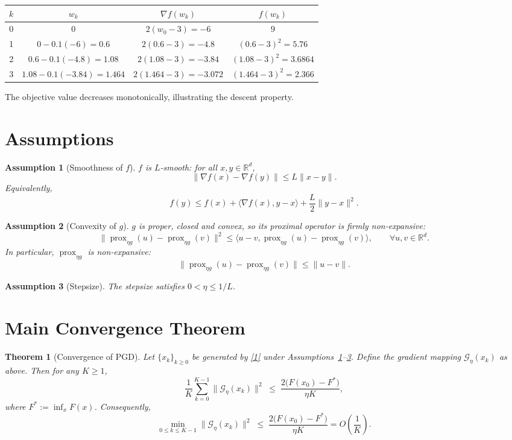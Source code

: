 \documentclass{article}
\newtheorem{theorem}{Theorem}
\newtheorem{assumption}{Assumption}
\newcommand{\prox}{\operatorname{prox}}
\newcommand{\grad}{\nabla}
\newcommand{\R}{\mathbb{R}}
\begin{document}
\begin{center}
\begin{tabular}{cccc}
\toprule
$k$ & $w_{k}$ & $\grad f(w_{k})$ & $f(w_{k})$\\
\midrule
0 & $0$                     & $2(w_{0}-3)=-6$      & $9$\\
1 & $0-0.1(-6)=0.6$         & $2(0.6-3)=-4.8$      & $(0.6-3)^{2}=5.76$\\
2 & $0.6-0.1(-4.8)=1.08$    & $2(1.08-3)=-3.84$    & $(1.08-3)^{2}=3.6864$\\
3 & $1.08-0.1(-3.84)=1.464$& $2(1.464-3)=-3.072$ & $(1.464-3)^{2}=2.366$\\
\bottomrule
\end{tabular}
\end{center}
The objective value decreases monotonically, illustrating the descent property.

\newpage
\section*{Assumptions}
\begin{assumption}[Smoothness of $f$]\label{as:lip}
$f$ is $L$‑smooth: for all $x,y\in\R^{d}$,
\[
\|\grad f(x)-\grad f(y)\|\le L\|x-y\|.
\]
Equivalently,
\[
f(y)\le f(x)+\langle\grad f(x),y-x\rangle+\frac{L}{2}\|y-x\|^{2}. \tag{2}
\]
\end{assumption}

\begin{assumption}[Convexity of $g$]\label{as:convex}
$g$ is proper, closed and convex, so its proximal operator is \emph{firmly non‑expansive}:
\[
\|\prox_{\eta g}(u)-\prox_{\eta g}(v)\|^{2}
\le \langle u-v,\prox_{\eta g}(u)-\prox_{\eta g}(v)\rangle,\qquad\forall u,v\in\R^{d}. \tag{3}
\]
In particular, $\prox_{\eta g}$ is non‑expansive:
\[
\|\prox_{\eta g}(u)-\prox_{\eta g}(v)\|\le\|u-v\|. \tag{4}
\]
\end{assumption}

\begin{assumption}[Stepsize]\label{as:step}
The stepsize satisfies $0<\eta\le 1/L$.
\end{assumption}

\section*{Main Convergence Theorem}
\begin{theorem}[Convergence of PGD]\label{thm:main}
Let $\{x_{k}\}_{k\ge0}$ be generated by \eqref{1} under Assumptions~\ref{as:lip}--\ref{as:step}. Define the gradient mapping $\mathcal{G}_{\eta}(x_{k})$ as above. Then for any $K\ge1$,
\[
\frac{1}{K}\sum_{k=0}^{K-1}\|\mathcal{G}_{\eta}(x_{k})\|^{2}
\;\le\;
\frac{2\big(F(x_{0})-F^{*}\big)}{\eta K},\tag{5}
\]
where $F^{*}:=\inf_{x}F(x)$. Consequently,
\[
\min_{0\le k\le K-1}\|\mathcal{G}_{\eta}(x_{k})\|^{2}
\;\le\;
\frac{2\big(F(x_{0})-F^{*}\big)}{\eta K}=O\!\left(\frac{1}{K}\right).
\]
\end{theorem}
\end{document}
